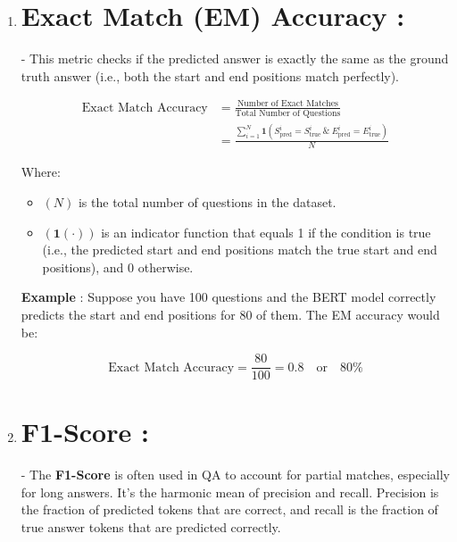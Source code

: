 \documentclass[10pt]{article}
\begin{document}
\begin{enumerate}
   \item 

      \section*{{ \bf Exact Match (EM) Accuracy }:}
      - This metric checks if the predicted answer is exactly the same as the ground truth answer (i.e., both the start and end positions match perfectly).

      \begin{align*}
         \text{Exact Match Accuracy} & = \frac{\text{Number of Exact Matches}}{\text{Total Number of Questions}} \\
         & = \frac{\sum_{i=1}^{N} \mathbf{1}(S_{\text{pred}}^i = S_{\text{true}}^i \ \&\  E_{\text{pred}}^i = E_{\text{true}}^i)}{N}
      \end{align*}

      Where:
      \begin{itemize}
         \item [-]$(N)$ is the total number of questions in the dataset.
         \item [-]$(\mathbf{1}(\cdot))$ is an indicator function that equals 1 if the condition is true (i.e., the predicted start and end positions match the true start and end positions), and 0 otherwise.
      \end{itemize}

      { \bf Example }: 
      Suppose you have 100 questions and the BERT model correctly predicts the start and end positions for 80 of them. The EM accuracy would be:

      $$
      \text{Exact Match Accuracy} = \frac{80}{100} = 0.8 \quad \text{or} \quad 80\%
      $$

   \item
      \section*{{ \bf F1-Score }:}
      - The { \bf F1-Score } is often used in QA to account for partial matches, especially for long answers. It’s the harmonic mean of precision and recall. Precision is the fraction of predicted tokens that are correct, and recall is the fraction of true answer tokens that are predicted correctly.


\end{enumerate}
\end{document}
